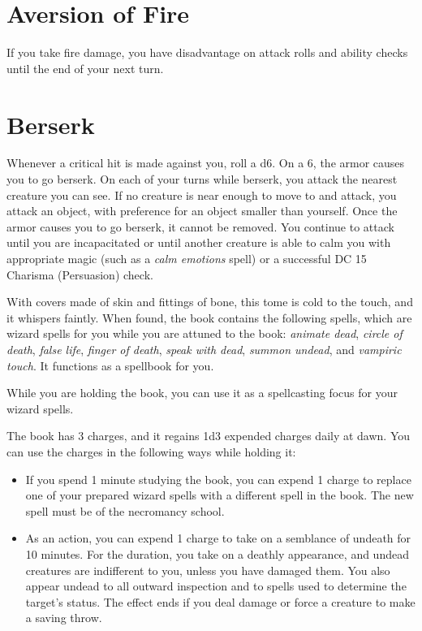 \documentclass[10pt,a4paper,twoside,bg=print,twocolumn,openany,nodeprecatedcode]{dndbook}
\begin{document}
\begin{itemize}
\section{Aversion of Fire}
If you take fire damage, you have disadvantage on attack rolls and ability checks until the end of your next turn.

\section{Berserk}
Whenever a critical hit is made against you, roll a d6. On a 6, the armor causes you to go berserk. On each of your turns while berserk, you attack the nearest creature you can see. If no creature is near enough to move to and attack, you attack an object, with preference for an object smaller than yourself. Once the armor causes you to go berserk, it cannot be removed. You continue to attack until you are incapacitated or until another creature is able to calm you with appropriate magic (such as a \textit{calm emotions} spell) or a successful DC 15 Charisma (Persuasion) check.

\end{itemize}

With covers made of skin and fittings of bone, this tome is cold to the touch, and it whispers faintly. When found, the book contains the following spells, which are wizard spells for you while you are attuned to the book: \textit{animate dead}, \textit{circle of death}, \textit{false life}, \textit{finger of death}, \textit{speak with dead}, \textit{summon undead}, and \textit{vampiric touch}. It functions as a spellbook for you.

While you are holding the book, you can use it as a spellcasting focus for your wizard spells.

The book has 3 charges, and it regains 1d3 expended charges daily at dawn. You can use the charges in the following ways while holding it:


\begin{itemize}
\item If you spend 1 minute studying the book, you can expend 1 charge to replace one of your prepared wizard spells with a different spell in the book. The new spell must be of the necromancy school.
\item As an action, you can expend 1 charge to take on a semblance of undeath for 10 minutes. For the duration, you take on a deathly appearance, and undead creatures are indifferent to you, unless you have damaged them. You also appear undead to all outward inspection and to spells used to determine the target's status. The effect ends if you deal damage or force a creature to make a saving throw.
\end{itemize}
\end{document}

